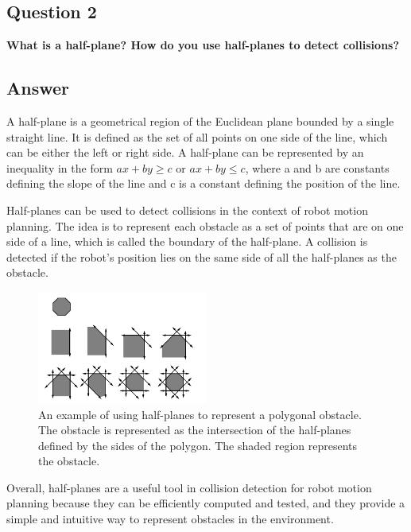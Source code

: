 \documentclass[12]{article}
\begin{document}
\subsection*{Question 2}
\textbf{What is a half-plane? How do you use half-planes to detect collisions?}
\subsection*{Answer}

A half-plane is a geometrical region of the Euclidean plane bounded by a single straight line. It is defined as the set of all points on one side of the line, which can be either the left or right side. A half-plane can be represented by an inequality in the form $ax + by \geq c$ or $ax + by \leq c$, where a and b are constants defining the slope of the line and c is a constant defining the position of the line.



Half-planes can be used to detect collisions in the context of robot motion planning. The idea is to represent each obstacle as a set of points that are on one side of a line, which is called the boundary of the half-plane. A collision is detected if the robot's position lies on the same side of all the half-planes as the obstacle. 


\begin{figure}[H]
\centering
\includegraphics[width=0.5\textwidth]{images/planning_book_half_plane.png}
\caption{An example of using half-planes to represent a polygonal obstacle. The obstacle is represented as the intersection of the half-planes defined by the sides of the polygon. The shaded region represents the obstacle.}
\label{fig:planning_book_half_plane}
\end{figure}

Overall, half-planes are a useful tool in collision detection for robot motion planning because they can be efficiently computed and tested, and they provide a simple and intuitive way to represent obstacles in the environment.
\end{document}
